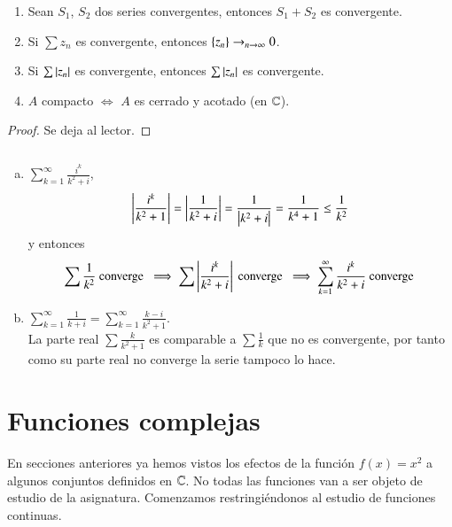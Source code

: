     \begin{pro}$ $
        \begin{enumerate}[1)]
            \item Sean $S_1$, $S_2$ dos series convergentes, entonces $S_1 + S_2$ es convergente.
            \item Si $\sum z_n$ es convergente, entonces $\left\{z_n\right\} \to_{n\to \infty} 0$.
            \item Si $\sum \left|z_n\right|$ es convergente, entonces $\sum \left|z_n\right|$ es convergente.
            \item $A$ compacto $\iff$ $A$ es cerrado y acotado (en $\mathbb{C}$).
        \end{enumerate}
    \end{pro}
    \begin{proof}
        Se deja al lector.
    \end{proof}

    \begin{eg}$ $
        \begin{enumerate}[a)]
            \item $\sum_{k=1}^{\infty} \frac{i^k}{k^2+i}$,
            $$
                \left|\frac{i^k}{k^2+1}\right| = \left|\frac{1}{k^2+i}\right| = \frac{1}{\left|k^2+i\right|} = \frac{1}{k^4+1} \leq \frac{1}{k^2}
            $$
            y entonces
            $$
                \sum \frac{1}{k^2} \text{ converge } \implies \sum \left|\frac{i^k}{k^2+i}\right| \text{ converge } \implies \sum_{k=1}^{\infty} \frac{i^k}{k^2+i} \text{ converge }
            $$
            \item $\sum_{k=1}^{\infty} \frac{1}{k+i} = \sum_{k=1}^{\infty} \frac{k-i}{k^2+1}$.\\

            La parte real $\sum \frac{k}{k^2+1}$ es comparable a $\sum \frac{1}{k}$ que no es convergente, por tanto como su parte real no converge la serie tampoco lo hace.
        \end{enumerate}
    \end{eg}

\section{Funciones complejas}

    En secciones anteriores ya hemos vistos los efectos de la función $f(x) = x^2$ a algunos conjuntos definidos en $\mathbb{C}$. No todas las funciones van a ser objeto de estudio de la asignatura. Comenzamos restringiéndonos al estudio de funciones continuas.

